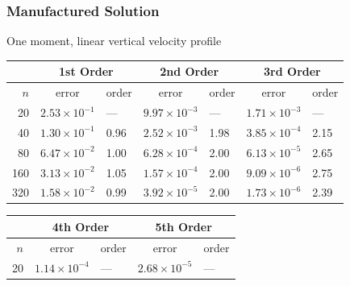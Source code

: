 \documentclass[10pt]{beamer}
\begin{document}
\begin{frame}
  \frametitle{Manufactured Solution}
  One moment, linear vertical velocity profile
  \footnotesize
  \begin{table}
    \centering
    \begin{tabular}{r*{6}l}
      \toprule
            & \multicolumn{2}{c}{1st Order} & \multicolumn{2}{c}{2nd Order} & \multicolumn{2}{c}{3rd Order}                                             \\
      \midrule
      \(n\) & \multicolumn{1}{c}{error}     & order                         & \multicolumn{1}{c}{error}     & order & \multicolumn{1}{c}{error} & order \\
      \midrule
      20    & \( 2.53 \times 10^{-1} \)     & ---                           & \( 9.97 \times 10^{-3} \)     & ---   & \( 1.71 \times 10^{-3} \) & ---   \\
      40    & \( 1.30 \times 10^{-1} \)     & 0.96                          & \( 2.52 \times 10^{-3} \)     & 1.98  & \( 3.85 \times 10^{-4} \) & 2.15  \\
      80    & \( 6.47 \times 10^{-2} \)     & 1.00                          & \( 6.28 \times 10^{-4} \)     & 2.00  & \( 6.13 \times 10^{-5} \) & 2.65  \\
      160   & \( 3.13 \times 10^{-2} \)     & 1.05                          & \( 1.57 \times 10^{-4} \)     & 2.00  & \( 9.09 \times 10^{-6} \) & 2.75  \\
      320   & \( 1.58 \times 10^{-2} \)     & 0.99                          & \( 3.92 \times 10^{-5} \)     & 2.00  & \( 1.73 \times 10^{-6} \) & 2.39  \\
      \bottomrule
    \end{tabular}
  \end{table}
  \begin{table}
    \centering
    \begin{tabular}{r*{4}l}
      \toprule
            & \multicolumn{2}{c}{4th Order} & \multicolumn{2}{c}{5th Order}                                      \\
      \midrule
      \(n\) & \multicolumn{1}{c}{error}     & order                         & \multicolumn{1}{c}{error}  & order \\
      \midrule
      20    & \( 1.14 \times 10^{-4} \)     & ---                           & \( 2.68 \times 10^{ -5} \) & ---   \\

\end{tabular}
\end{table}
\end{frame}
\end{document}

